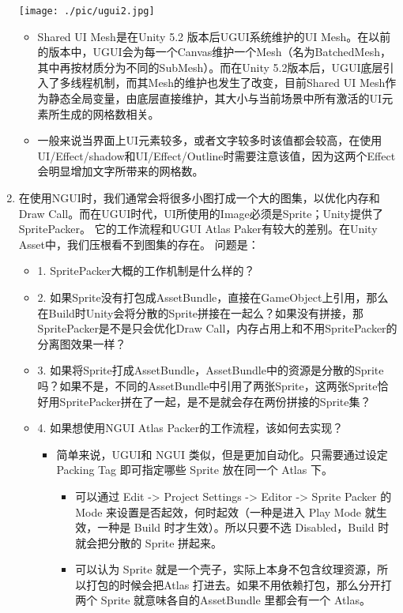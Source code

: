 \documentclass[9pt, b5paper]{article}
\begin{document}
\begin{enumerate}
\begin{center}
\texttt{[image: ./pic/ugui2.jpg]}
\end{center}
\begin{itemize}
\item Shared UI Mesh是在Unity 5.2 版本后UGUI系统维护的UI Mesh。在以前的版本中，UGUI会为每一个Canvas维护一个Mesh（名为BatchedMesh，其中再按材质分为不同的SubMesh）。而在Unity 5.2版本后，UGUI底层引入了多线程机制，而其Mesh的维护也发生了改变，目前Shared UI Mesh作为静态全局变量，由底层直接维护，其大小与当前场景中所有激活的UI元素所生成的网格数相关。
\item 一般来说当界面上UI元素较多，或者文字较多时该值都会较高，在使用UI/Effect/shadow和UI/Effect/Outline时需要注意该值，因为这两个Effect会明显增加文字所带来的网格数。
\end{itemize}
\item 在使用NGUI时，我们通常会将很多小图打成一个大的图集，以优化内存和Draw Call。而在UGUI时代，UI所使用的Image必须是Sprite；Unity提供了SpritePacker。 它的工作流程和UGUI Atlas Paker有较大的差别。在Unity Asset中，我们压根看不到图集的存在。 问题是：
\label{sec:orgeb9c0c1}
\begin{itemize}
\item 1. SpritePacker大概的工作机制是什么样的？
\item 2. 如果Sprite没有打包成AssetBundle，直接在GameObject上引用，那么在Build时Unity会将分散的Sprite拼接在一起么？如果没有拼接，那SpritePacker是不是只会优化Draw Call，内存占用上和不用SpritePacker的分离图效果一样？
\item 3. 如果将Sprite打成AssetBundle，AssetBundle中的资源是分散的Sprite吗？如果不是，不同的AssetBundle中引用了两张Sprite，这两张Sprite恰好用SpritePacker拼在了一起，是不是就会存在两份拼接的Sprite集？
\item 4. 如果想使用NGUI Atlas Packer的工作流程，该如何去实现？
\begin{itemize}
\item 简单来说，UGUI和 NGUI 类似，但是更加自动化。只需要通过设定 Packing Tag 即可指定哪些 Sprite 放在同一个 Atlas 下。
\begin{itemize}
\item 可以通过 Edit -> Project Settings -> Editor -> Sprite Packer 的 Mode 来设置是否起效，何时起效（一种是进入 Play Mode 就生效，一种是 Build 时才生效）。所以只要不选 Disabled，Build 时就会把分散的 Sprite 拼起来。
\item 可以认为 Sprite 就是一个壳子，实际上本身不包含纹理资源，所以打包的时候会把Atlas 打进去。如果不用依赖打包，那么分开打两个 Sprite 就意味各自的AssetBundle 里都会有一个 Atlas。

\end{itemize}
\end{itemize}
\end{itemize}
\end{enumerate}
\end{document}
